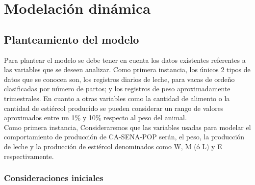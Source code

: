 
\section{Modelación dinámica} \label{dinamod}
\subsection{Planteamiento del modelo}

Para plantear el modelo se debe tener en cuenta los datos existentes referentes a las variables que se deseen analizar. Como primera instancia, los únicos 2 tipos de datos que se conocen son, los registros diarios de leche, para vacas de ordeño clasificadas por número de partos; y los registros de peso aproximadamente trimestrales. En cuanto a otras variables como la cantidad de alimento o la cantidad de estiércol producido se pueden considerar un rango de valores aproximados entre un 1\% y 10\% respecto al peso del animal. \\

Como primera instancia, Consideraremos que las variables usadas para modelar el comportamiento de producción de CA-SENA-POP serán, el peso, la producción de leche y la producción de estiércol denominados como W, M (ó L) y E respectivamente.

\subsubsection{Consideraciones iniciales}

